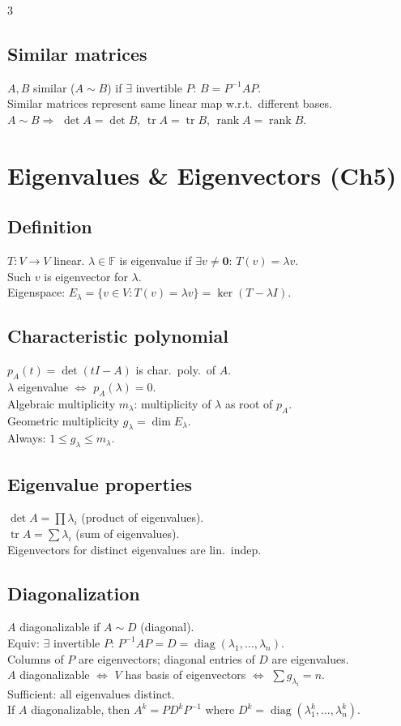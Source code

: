 \documentclass[10pt]{article}
\newcommand{\F}{\mathbb{F}}
\newcommand{\rank}{\operatorname{rank}}
\newcommand{\Ker}{\operatorname{ker}}
\newcommand{\tr}{\operatorname{tr}}
\newcommand{\diag}{\operatorname{diag}}
\begin{document}
\begin{multicols}{3}
\subsection*{Similar matrices}
$A,B$ similar ($A\sim B$) if $\exists$ invertible $P$: $B=P^{-1}AP$.\\
Similar matrices represent same linear map w.r.t.\ different bases.\\
$A\sim B\Rightarrow$ $\det A=\det B$, $\tr A=\tr B$, $\rank A=\rank B$.

\section*{Eigenvalues \& Eigenvectors (Ch5)}

\subsection*{Definition}
$T:V\to V$ linear. $\lambda\in\F$ is eigenvalue if $\exists v\neq\bm{0}$: $T(v)=\lambda v$.\\
Such $v$ is eigenvector for $\lambda$.\\
Eigenspace: $E_\lambda=\{v\in V:T(v)=\lambda v\}=\Ker(T-\lambda I)$.

\subsection*{Characteristic polynomial}
$p_A(t)=\det(tI-A)$ is char.\ poly.\ of $A$.\\
$\lambda$ eigenvalue $\Leftrightarrow$ $p_A(\lambda)=0$.\\
Algebraic multiplicity $m_\lambda$: multiplicity of $\lambda$ as root of $p_A$.\\
Geometric multiplicity $g_\lambda=\dim E_\lambda$.\\
Always: $1\le g_\lambda\le m_\lambda$.

\subsection*{Eigenvalue properties}
$\det A=\prod\lambda_i$ (product of eigenvalues).\\
$\tr A=\sum\lambda_i$ (sum of eigenvalues).\\
Eigenvectors for distinct eigenvalues are lin.\ indep.

\subsection*{Diagonalization}
$A$ diagonalizable if $A\sim D$ (diagonal).\\
Equiv: $\exists$ invertible $P$: $P^{-1}AP=D=\diag(\lambda_1,\ldots,\lambda_n)$.\\
Columns of $P$ are eigenvectors; diagonal entries of $D$ are eigenvalues.\\
$A$ diagonalizable $\Leftrightarrow$ $V$ has basis of eigenvectors $\Leftrightarrow$ $\sum g_{\lambda_i}=n$.\\
Sufficient: all eigenvalues distinct.\\
If $A$ diagonalizable, then $A^k=PD^kP^{-1}$ where $D^k=\diag(\lambda_1^k,\ldots,\lambda_n^k)$.


\end{multicols}
\end{document}
